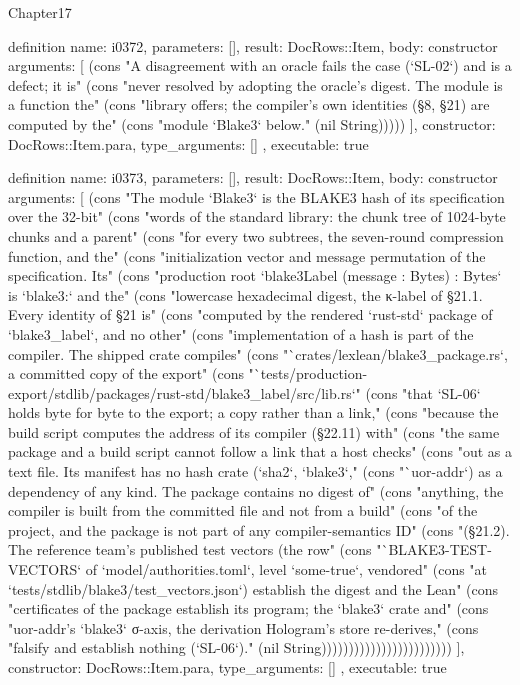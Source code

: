 \begin{lexlean}{Chapter17}
\begin{semanticmodule}
definition{
  name: i0372,
  parameters: [],
  result: DocRows::Item,
  body: constructor{
    arguments: [
      (cons "A disagreement with an oracle fails the case (`SL-02`) and is a defect; it is" (cons "never resolved by adopting the oracle's digest. The module is a function the" (cons "library offers; the compiler's own identities (§8, §21) are computed by the" (cons "module `Blake3` below." (nil String)))))
    ],
    constructor: DocRows::Item.para,
    type_arguments: []
  },
  executable: true
}

definition{
  name: i0373,
  parameters: [],
  result: DocRows::Item,
  body: constructor{
    arguments: [
      (cons "The module `Blake3` is the BLAKE3 hash of its specification over the 32-bit" (cons "words of the standard library: the chunk tree of 1024-byte chunks and a parent" (cons "for every two subtrees, the seven-round compression function, and the" (cons "initialization vector and message permutation of the specification. Its" (cons "production root `blake3Label (message : Bytes) : Bytes` is `blake3:` and the" (cons "lowercase hexadecimal digest, the κ-label of §21.1. Every identity of §21 is" (cons "computed by the rendered `rust-std` package of `blake3_label`, and no other" (cons "implementation of a hash is part of the compiler. The shipped crate compiles" (cons "`crates/lexlean/blake3_package.rs`, a committed copy of the export" (cons "`tests/production-export/stdlib/packages/rust-std/blake3_label/src/lib.rs`" (cons "that `SL-06` holds byte for byte to the export; a copy rather than a link," (cons "because the build script computes the address of its compiler (§22.11) with" (cons "the same package and a build script cannot follow a link that a host checks" (cons "out as a text file. Its manifest has no hash crate (`sha2`, `blake3`," (cons "`uor-addr`) as a dependency of any kind. The package contains no digest of" (cons "anything, the compiler is built from the committed file and not from a build" (cons "of the project, and the package is not part of any compiler-semantics ID" (cons "(§21.2). The reference team's published test vectors (the row" (cons "`BLAKE3-TEST-VECTORS` of `model/authorities.toml`, level `some-true`, vendored" (cons "at `tests/stdlib/blake3/test_vectors.json`) establish the digest and the Lean" (cons "certificates of the package establish its program; the `blake3` crate and" (cons "uor-addr's `blake3` σ-axis, the derivation Hologram's store re-derives," (cons "falsify and establish nothing (`SL-06`)." (nil String))))))))))))))))))))))))
    ],
    constructor: DocRows::Item.para,
    type_arguments: []
  },
  executable: true
}


\end{semanticmodule}
\end{lexlean}
